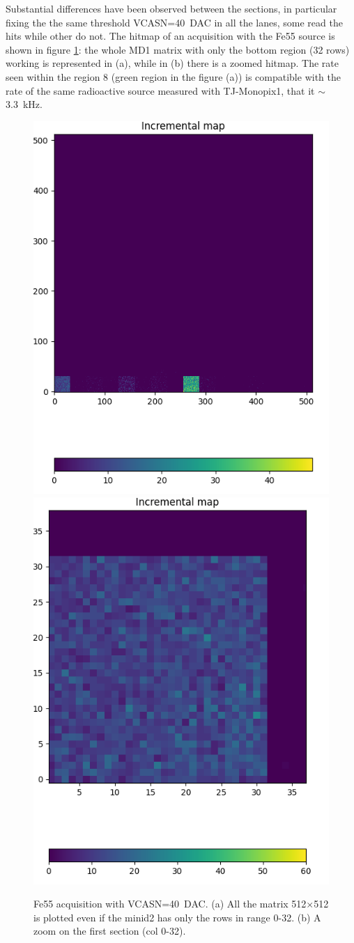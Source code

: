     Substantial differences have been observed between the sections, in particular fixing the the same threshold VCASN=\SI{40}{DAC} in all the lanes, some read the hits while other do not. 
    The hitmap of an acquisition with the Fe55 source is shown in figure \ref{fig:ARCADIA_Fe55}: the whole MD1 matrix with only the bottom region (32 rows) working is represented in (a), while in (b) there is a zoomed hitmap. The rate seen within the region 8 (green region in the figure (a)) is compatible with the rate of the same radioactive source measured with TJ-Monopix1, that it $\sim$\SI{3.3}{kHz}. 
    \begin{figure}[h!]
        \centering
        \includegraphics[width=.49\linewidth]{figures/charaterization/ARCADIA/Fe55_5min30s.png}
        \includegraphics[width=.47\linewidth]{figures/charaterization/ARCADIA/Fe55_6min30s.png}
        \caption{Fe55 acquisition with VCASN=\SI{40}{DAC}. (a) All the matrix 512$\times$512 is plotted even if the minid2 has only the rows in range 0-32. (b) A zoom on the first section (col 0-32).   }
        \label{fig:ARCADIA_Fe55}
    \end{figure}  
